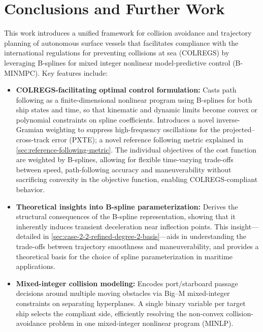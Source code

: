 
\chapter{Conclusions and Further Work}
\label{chap:conclusions}

This work introduces a unified framework for collision avoidance and trajectory planning of autonomous surface vessels that facilitates compliance with the international regulations for preventing collisions at sea (COLREGS) by leveraging B‐splines for mixed integer nonlinear model‐predictive control (B-MINMPC).  Key features include:

\begin{itemize}
    \item \textbf{COLREGS-facilitating optimal control formulation:}  Casts path following as a finite-dimensional nonlinear program using B-splines for both ship states and time, so that kinematic and dynamic limits become convex or polynomial constraints on spline coefficients. Introduces a novel inverse-Gramian weighting to suppress high-frequency oscillations for the projected–cross-track error (PXTE); a novel reference following metric explained in \cref{sec:reference-following-metric}. The individual objectives of the cost function are weighted by B-splines, allowing for flexible time-varying trade-offs between speed, path-following accuracy and maneuverability without sacrificing convexity in the objective function, enabling COLREGS-compliant behavior.
    
    \item \textbf{Theoretical insights into B-spline parameterization:}  Derives the structural consequences of the B-spline representation, showing that it inherently induces transient deceleration near inflection points. This insight---detailed in \cref{sec:case-2-2-refined-degree-2-basis}---aids in understanding the trade-offs between trajectory smoothness and maneuverability, and provides a theoretical basis for the choice of spline parameterization in maritime applications.

    \item \textbf{Mixed-integer collision modeling:}  Encodes port/starboard passage decisions around multiple moving obstacles via Big–M mixed-integer constraints on separating hyperplanes. A single binary variable per target ship selects the compliant side, efficiently resolving the non-convex collision-avoidance problem in one mixed-integer nonlinear program (MINLP).


\end{itemize}
